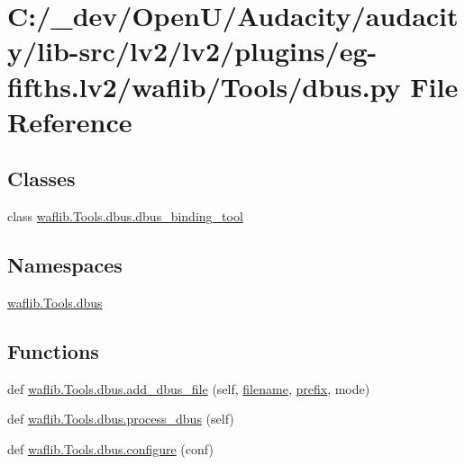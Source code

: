 \hypertarget{lv2_2plugins_2eg-fifths_8lv2_2waflib_2_tools_2dbus_8py}{}\section{C\+:/\+\_\+dev/\+Open\+U/\+Audacity/audacity/lib-\/src/lv2/lv2/plugins/eg-\/fifths.lv2/waflib/\+Tools/dbus.py File Reference}
\label{lv2_2plugins_2eg-fifths_8lv2_2waflib_2_tools_2dbus_8py}
\subsection*{Classes}
\begin{DoxyCompactItemize}
\item 
class \hyperlink{classwaflib_1_1_tools_1_1dbus_1_1dbus__binding__tool}{waflib.\+Tools.\+dbus.\+dbus\+\_\+binding\+\_\+tool}
\end{DoxyCompactItemize}
\subsection*{Namespaces}
\begin{DoxyCompactItemize}
\item 
 \hyperlink{namespacewaflib_1_1_tools_1_1dbus}{waflib.\+Tools.\+dbus}
\end{DoxyCompactItemize}
\subsection*{Functions}
\begin{DoxyCompactItemize}
\item 
def \hyperlink{namespacewaflib_1_1_tools_1_1dbus_a6984c3a3293d830848a5b9e06326a353}{waflib.\+Tools.\+dbus.\+add\+\_\+dbus\+\_\+file} (self, \hyperlink{test__portburn_8cpp_a7efa5e9c7494c7d4586359300221aa5d}{filename}, \hyperlink{structprefix}{prefix}, mode)
\item 
def \hyperlink{namespacewaflib_1_1_tools_1_1dbus_a75dbed39a93f5b22ad67c948e91f2008}{waflib.\+Tools.\+dbus.\+process\+\_\+dbus} (self)
\item 
def \hyperlink{namespacewaflib_1_1_tools_1_1dbus_abce63288e0395b45e8006bd6cc81edb7}{waflib.\+Tools.\+dbus.\+configure} (conf)
\end{DoxyCompactItemize}
